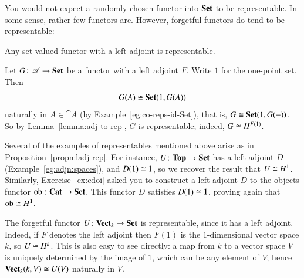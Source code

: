 You would not expect a randomly-chosen functor into $\mathbf{Set}$ to be
rep\-re\-sen\-table.  In some sense, rather few functors are.  However,
forgetful%
%
%
functors do tend to be representable:
%
\begin{propn}
\label{propn:ladj-rep}
\hspace*{-2.5pt}Any set-valued functor with a left adjoint is representable.
\end{propn}

\begin{pf}
Let $G\from \cat{A} \to \Set$ be a functor with a left adjoint $F$.  Write
$1$ for the one-point set.  Then
\[
G(A) \cong \mathbf{Set}(1, G(A))
\]
naturally in $A \in \cat{A}$
(by Example~\ref{eg:co-reps-id-Set}), that is, $G \cong
\mathbf{Set}(1, G(-))$.  So by Lemma~\ref{lemma:adj-to-rep}, $G$ is
representable; indeed, $G \cong H^{F(1)}$.
\end{pf}

\begin{example}
Several of the examples of representables mentioned above arise as in
Proposition~\ref{propn:ladj-rep}.  For instance, $U \from \Tp \to \Set$
has a left adjoint $D$%
%
%
(Example~\ref{eg:adjn:spaces}), and $D(1) \cong 1$, so we recover the result
that $U \cong H^1$.  Similarly, Exercise~\ref{ex:cdoi} asked you to
construct a left adjoint $D$%
%
%
to the objects functor $\ob\from \Cat \to \Set$.  This functor $D$
satisfies $D(1) \cong \mathbf{1}$, proving again that $\operatorname{ob} \cong H^{\mathbf{1}}$.
\end{example}

\begin{example}
The forgetful functor $U\from \Vect_k \to \Set$ is representable,\linebreak
since it has a left adjoint.%
%
%
Indeed, if $F$ denotes the left adjoint then $F(1)$ is the $1$-dimensional
vector space $k$, so $U \cong H^k$.  This is also easy to see directly: a
map from $k$ to a vector space $V$ is uniquely determined by the image of
$1$, which can be any element of $V$; hence $\mathbf{Vect}_k(k, V) \cong U(V)$
naturally in $V$.
\end{example}

